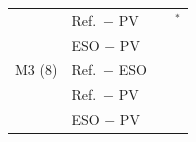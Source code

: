 \begin{table}[!t]
\begin{tabular}{@{}llll@{}}
 & Ref.\ $-$ PV & \RNumHFourBRefMinusPVBFourSteadyCell{} & \RNumHFourBRefMinusPVBFourNewTopicCell{}$^{\ast}$ \\
 & ESO $-$ PV & \RNumHFourBESOMinusPVBFourSteadyCell{} & \RNumHFourBESOMinusPVBFourNewTopicCell{} \\
M3 ($8$) & Ref.\ $-$ ESO & \RNumHFourBRefMinusESOBEightSteadyCell{} & \RNumHFourBRefMinusESOBEightNewTopicCell{} \\
 & Ref.\ $-$ PV & \RNumHFourBRefMinusPVBEightSteadyCell{} & \RNumHFourBRefMinusPVBEightNewTopicCell{} \\
 & ESO $-$ PV & \RNumHFourBESOMinusPVBEightSteadyCell{} & \RNumHFourBESOMinusPVBEightNewTopicCell{} \\
\bottomrule
\end{tabular}
\end{table}

